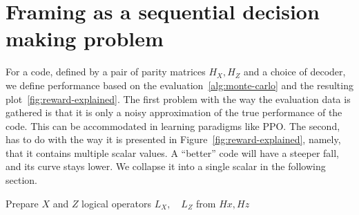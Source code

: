 \section{Framing as a sequential decision making problem}\label{sec:mdp}
For a code, defined by a pair of parity matrices \(H_X, H_Z\) and a choice of decoder, we define performance based on the evaluation~\ref{alg:monte-carlo} and the resulting plot~\ref{fig:reward-explained}.
The first problem with the way the evaluation data is gathered is that it is only a noisy approximation of the true performance of the code. 
This can be accommodated in learning paradigms like PPO.
The second, has to do with the way it is presented in Figure~\ref{fig:reward-explained}, namely, 
that it contains multiple scalar values. 
A ``better'' code will have a steeper fall, and its curve stays lower. We collapse it into a single scalar in the following section.
\begin{algorithm*}
\DontPrintSemicolon
\caption{A Monte Carlo evaluation of code-decoder pair}
\label{alg:monte-carlo}
Prepare \(X\) and \(Z\) logical operators \(L_X,\quad L_Z\) from \(Hx, Hz\)\;
\end{algorithm*}

